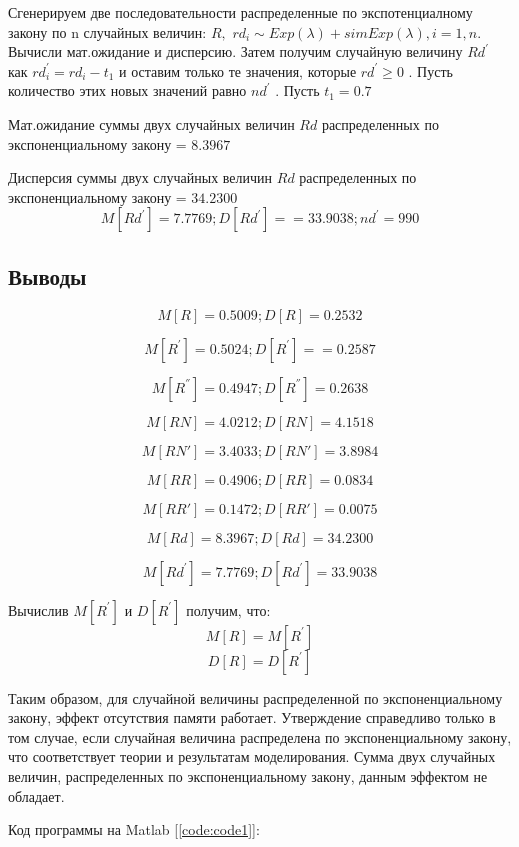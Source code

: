 Сгенерируем две последовательности распределенные по
экспотенциалному закону по n случайных величин:  $R,$
$rd_{i}\sim Exp(\lambda)+sim Exp(\lambda),i=1,n$.
Вычисли мат.ожидание и дисперсию. Затем получим случайную величину $Rd^{'}$ как
$rd_{i}^{'}=rd_{i}-t_{1}$ и оставим только те значения, которые $rd^{'}\geq0$ .
Пусть количество этих новых значений равно $nd^{'}$ . Пусть $t_{1}=0.7$

Мат.ожидание суммы двух случайных величин $ Rd $ распределенных по
экспоненциальному закону = $ 8.3967  $

Дисперсия суммы двух случайных величин $ Rd $ распределенных по
экспоненциальному закону = $ 34.2300 $ 
\[ M[Rd^{'}]= 7.7769; D[Rd^{'}]= = 33.9038; nd^{'}= 990 \]
 

\subsection{Выводы}

\[ M[R]= 0.5009; D[R]= 0.2532  \]


\[ M[R^{'}]= 0.5024; D[R^{'}]= = 0.2587 \]


\[ M[R^{''}]= 0.4947; D[R^{''}]= 0.2638 \]


\[ M[RN]= 4.0212; D[RN]=4.1518 \]


\[ M[RN']= 3.4033; D[RN']= 3.8984 \]


\[ M[RR]= 0.4906; D[RR]= 0.0834 \]


\[ M[RR']= 0.1472; D[RR']= 0.0075 \]

\[ M[Rd]= 8.3967; D[Rd]= 34.2300 \]

\[ M[Rd^{'}]= 7.7769; D[Rd^{'}]= 33.9038 \]

Вычислив $M[R^{'}]$ и $D[R^{'}]$ получим, что:
\[ M[R]=M[R^{'}]\]
\[D[R]=D[R^{'}] \]

Таким образом, для случайной величины распределенной по экспоненциальному
закону, эффект отсутствия памяти работает. Утверждение справедливо
только в том случае, если случайная величина распределена по экспоненциальному
закону, что соответствует теории и результатам моделирования. Сумма двух
случайных величин, распределенных по экспоненциальному закону, данным эффектом не
обладает.

Код программы на Matlab [\ref{code:code1}]:
%
\newpage